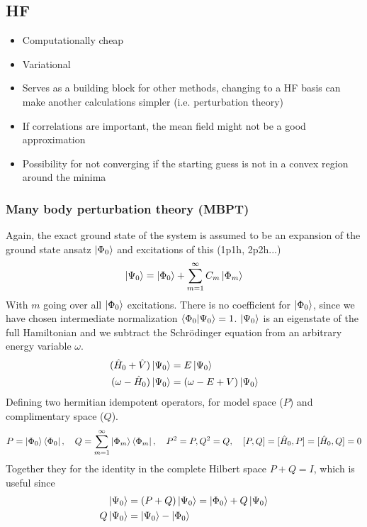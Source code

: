 \documentclass[
11pt,notheorems,hyperref={pdfauthor=whatever}
]{beamer}
\begin{document}
\subsection{HF}
\begin{frame}
    \textcolor{Green}{}
    \begin{itemize}
        \item Computationally cheap
        \item Variational 
        \item Serves as a building block for other methods, changing to a HF basis can make another calculations simpler (i.e. perturbation theory)
    \end{itemize}
    \vspace{20px}
    \textcolor{Red}{}
    \begin{itemize}
        \item If correlations are important, the mean field might not be a good approximation
        \item Possibility for not converging if the starting guess is not in a convex region around the minima
    \end{itemize}
\end{frame}

\begin{frame}
    \frametitle{Many body perturbation theory (MBPT)}
    Again, the exact ground state of the system is assumed to be an expansion of the ground state ansatz $\ket{\Phi_0}$ and excitations of this (1p1h, 2p2h...)
    \begin{align*}
        \ket{\Psi_0} = \ket{\Phi_0} + \sum_{m=1}^{\infty}C_m \ket{\Phi_m}
    \end{align*}
    With $m$ going over all $\ket{\Phi_0}$ excitations. There is no coefficient for $\ket{\Phi_0}$, since we have chosen intermediate normalization $\braket{\Phi_0 | \Psi_0} = 1$. $\ket{\Psi_0}$ is an eigenstate of the full Hamiltonian and we subtract the Schr\"{o}dinger equation from an arbitrary energy variable $\omega$. 
    \begin{align*}
        (\hat{H}_0 + \hat{V})\ket{\Psi_0} &= E \ket{\Psi_0} \\
        (\omega - \hat{H}_0)\ket{\Psi_0} &= (\omega-E+V)\ket{\Psi_0}
    \end{align*} 
    Defining two hermitian idempotent operators, for model space ($P$) and complimentary space ($Q$).
    \begin{align*}
        P = \ket{\Phi_0}\bra{\Phi_0}, \hspace{10px} Q = \sum_{m=1}^\infty \ket{\Phi_m}\bra{\Phi_m},\hspace{10px} P^2 = P, Q^2 = Q,\hspace{10px} [P,Q] = [\hat{H}_0, P] = [\hat{H}_0, Q] = 0
    \end{align*}
    Together they for the identity in the complete Hilbert space $P + Q = I$, which is useful since
    \begin{align*}
        \ket{\Psi_0} &= (P+Q)\ket{\Psi_0} = \ket{\Phi_0} + Q\ket{\Psi_0} \\
        Q\ket{\Psi_0} &= \ket{\Psi_0} - \ket{\Phi_0} 
    \end{align*}  
\end{frame}
\end{document}
